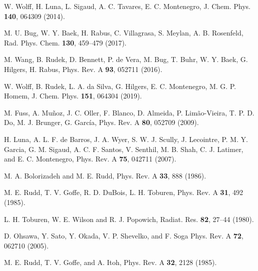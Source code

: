 \begin{thebibliography}{9}
W. Wolff, H. Luna, L. Sigaud, A. C. Tavares, E. C. Montenegro,
J. Chem. Phys. \textbf{140}, 064309 (2014).

M. U. Bug, W. Y. Baek, H. Rabus, C. Villagrasa, S. Meylan, A. B. Rosenfeld,
Rad. Phys. Chem. \textbf{130}, 459--479 (2017).

M. Wang, B. Rudek, D. Bennett, P. de Vera, M. Bug, T. Buhr, W. Y. Baek, 
G. Hilgers, H. Rabus, 
Phys. Rev. A \textbf{93}, 052711 (2016).

W. Wolff, B. Rudek, L. A. da Silva, G. Hilgers, E. C. Montenegro, 
M. G. P. Homem,
J. Chem. Phys. \textbf{151}, 064304 (2019).

M. Fuss, A. Muñoz, J. C. Oller, F. Blanco, D. Almeida, P. Limão-Vieira, 
T. P. D. Do, M. J. Brunger, G. Garc\'{i}a,
Phys. Rev. A \textbf{80}, 052709 (2009).

H. Luna, A. L. F. de Barros, J. A. Wyer, S. W. J. Scully, J. Lecointre, 
P. M. Y. Garcia, G. M. Sigaud, A. C. F. Santos, V. Senthil, M. B. Shah, 
C. J. Latimer, and E. C. Montenegro,
Phys. Rev. A \textbf{75}, 042711 (2007).

M. A. Bolorizadeh and M. E. Rudd, 
Phys. Rev. A \textbf{33}, 888 (1986). 

M. E. Rudd, T. V. Goffe, R. D. DuBois, L. H. Toburen, 
Phys. Rev. A \textbf{31}, 492 (1985). 

L. H. Toburen, W. E. Wilson and R. J. Popowich,
Radiat. Res. \textbf{82}, 27--44 (1980).

D. Ohsawa, Y. Sato, Y. Okada, V. P. Shevelko, and F. Soga
Phys. Rev. A \textbf{72}, 062710 (2005).

M. E. Rudd, T. V. Goffe, and A. Itoh, 
Phys. Rev. A \textbf{32}, 2128 (1985).


\end{thebibliography}
